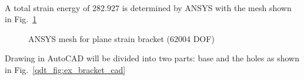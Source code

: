 \paragraph{}
A total strain energy of $282.927$ is determined by ANSYS with the mesh shown in Fig.~\ref{qdt_fig:ex_bracket_ansys_mesh}
    \begin{figure}[H]
        \centering
        \caption{ANSYS mesh for plane strain bracket (62004 DOF)}
        \label{qdt_fig:ex_bracket_ansys_mesh}
    \end{figure}
%
Drawing in AutoCAD will be divided into two parts: base and the holes as shown in Fig.~\ref{qdt_fig:ex_bracket_cad}

